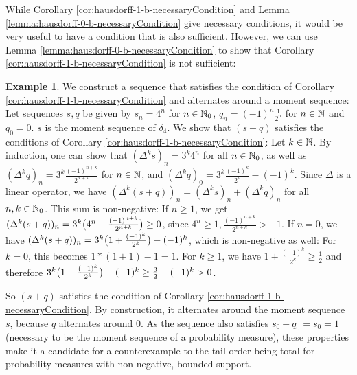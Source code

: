 \documentclass[a4paper]{scrreprt}
\theoremstyle{definition}
\newtheorem{ex}[thm]{Example} %
\begin{document}
    While Corollary \ref{cor:hausdorff-1-b-necessaryCondition} and Lemma \ref{lemma:hausdorff-0-b-necessaryCondition} give necessary conditions, it would be very useful to have a condition that is also sufficient. However, we can use Lemma \ref{lemma:hausdorff-0-b-necessaryCondition} to show that Corollary \ref{cor:hausdorff-1-b-necessaryCondition} is not sufficient:
    
    \begin{ex}
        We construct a sequence that satisfies the condition of Corollary \ref{cor:hausdorff-1-b-necessaryCondition} and alternates around a moment sequence:
        Let sequences $s, q$ be given by $s_n = 4^n$ for $n \in \mathbb{N}_0$, $q_n = (-1)^n\frac{1}{2^n}$ for $n \in \mathbb{N}$ and $q_0 = 0$. $s$ is the moment sequence of $\delta_4$. We show that $(s + q)$ satisfies the conditions of Corollary \ref{cor:hausdorff-1-b-necessaryCondition}:
        Let $k \in \mathbb{N}$.
        By induction, one can show that $(\Delta^k s)_n = 3^k 4^n$ for all $n \in \mathbb{N}_0$, as well as $(\Delta^k q)_n = 3^k\frac{(-1)^{n+k}}{2^{n+k}}$ for $n \in \mathbb{N}$, and $(\Delta^k q)_0 = 3^k \frac{(-1)^k}{2^k} - (-1)^k$.
        Since $\Delta$ is a linear operator, we have ${(\Delta^k (s+q))_n} = {(\Delta^k s)_n + (\Delta^k q)_n}$ for all $n, k \in \mathbb{N}_0$. This sum is non-negative:
        If $n \geq 1$, we get $(\Delta^k (s+q))_n = 3^k\bigl(4^n + \frac{(-1)^{n+k}}{2^{n+k}}\bigr) \geq 0$, since $4^n \geq 1, \frac{(-1)^{n+k}}{2^{n+k}} > -1$.
        If $n = 0$, we have ${(\Delta^k (s+q))_n} = {3^k\bigl(1 + \frac{(-1)^{k}}{2^{k}}\bigr) - (-1)^k}$, which is non-negative as well:
        For $k = 0$, this becomes ${1*(1 + 1) - 1 = 1}$.
        For $k \geq 1$, we have $1 + \frac{(-1)^{k}}{2^{k}} \geq \frac{1}{2}$ and therefore $3^k\bigl(1 + \frac{(-1)^{k}}{2^{k}}\bigr) - (-1)^k \geq \frac{3}{2} - (-1)^k > 0$.
        
        
        So $(s+q)$ satisfies the condition of Corollary \ref{cor:hausdorff-1-b-necessaryCondition}. 
        By construction, it alternates around the moment sequence $s$, because $q$ alternates around 0.
        As the sequence also satisfies $s_0 + q_0 = s_0 = 1$ (necessary to be the moment sequence of a probability measure), these properties make it a candidate for a counterexample to the tail order being total for probability measures with non-negative, bounded support. 
        

\end{ex}
\end{document}
